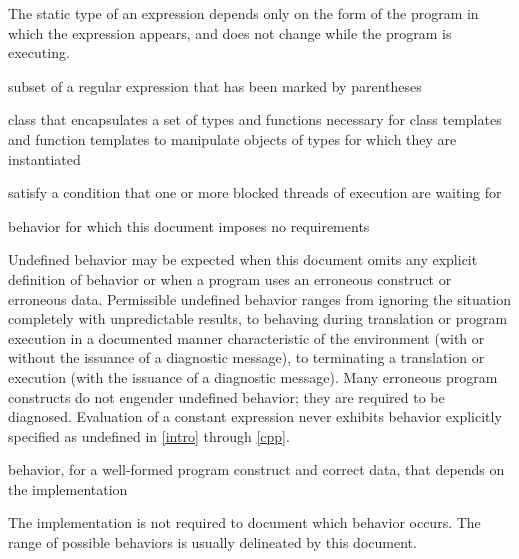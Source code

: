 \begin{defnote}
The static type of an expression depends only on the form of the program in
which the expression appears, and does not change while the program is
executing.
\end{defnote}

%
subset of a regular expression that has
been marked by parentheses

%
class that encapsulates a set of types and functions necessary for class templates and
function templates to manipulate objects of types for which they are instantiated

%
satisfy a condition that one or more blocked threads of execution are waiting for

%
behavior for which this document
imposes no requirements

\begin{defnote}
Undefined behavior may be expected when
this document omits any explicit
definition of behavior or when a program uses an erroneous construct or erroneous data.
Permissible undefined behavior ranges
from ignoring the situation completely with unpredictable results, to
behaving during translation or program execution in a documented manner
characteristic of the environment (with or without the issuance of a
diagnostic message), to terminating a translation or execution (with the
issuance of a diagnostic message). Many erroneous program constructs do
not engender undefined behavior; they are required to be diagnosed.
Evaluation of a constant expression never exhibits behavior explicitly
specified as undefined in \ref{intro} through \ref{cpp}.
\end{defnote}

%
behavior, for a well-formed program construct and correct data, that
depends on the implementation

\begin{defnote}
The implementation is not required to
document which behavior occurs. The range of
possible behaviors is usually delineated by this document.
\end{defnote}

